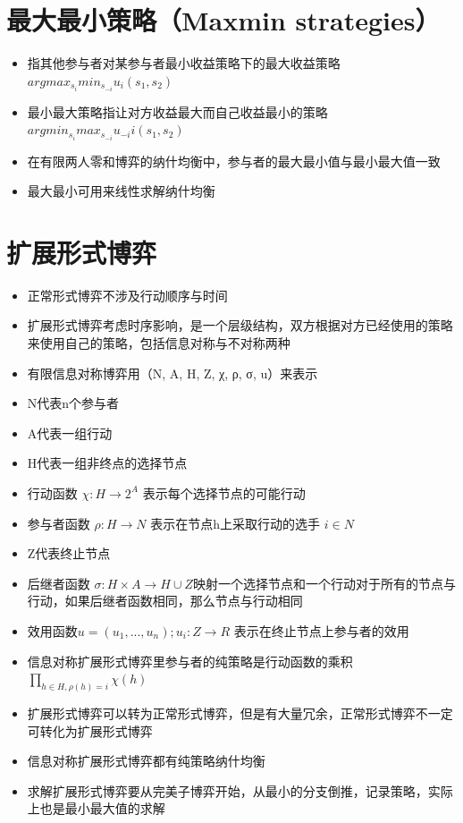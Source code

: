 \documentclass[
]{book}
\providecommand{\tightlist}{%
  \setlength{\itemsep}{0pt}\setlength{\parskip}{0pt}}
\begin{document}
\hypertarget{ux6700ux5927ux6700ux5c0fux7b56ux7565maxmin-strategies}{%
\section{最大最小策略（Maxmin strategies）}\label{ux6700ux5927ux6700ux5c0fux7b56ux7565maxmin-strategies}}

\begin{itemize}
\tightlist
\item
  指其他参与者对某参与者最小收益策略下的最大收益策略\(arg max_{s_i}min_{s_{-i}}u_i(s_1,s_2)\)
\item
  最小最大策略指让对方收益最大而自己收益最小的策略\(arg min_{s_i}max_{s_{-i}}u_{-i}i(s_1,s_2)\)
\item
  在有限两人零和博弈的纳什均衡中，参与者的最大最小值与最小最大值一致
\item
  最大最小可用来线性求解纳什均衡
\end{itemize}

\hypertarget{ux6269ux5c55ux5f62ux5f0fux535aux5f08}{%
\section{扩展形式博弈}\label{ux6269ux5c55ux5f62ux5f0fux535aux5f08}}

\begin{itemize}
\tightlist
\item
  正常形式博弈不涉及行动顺序与时间
\item
  扩展形式博弈考虑时序影响，是一个层级结构，双方根据对方已经使用的策略来使用自己的策略，包括信息对称与不对称两种
\item
  有限信息对称博弈用（N, A, H, Z, χ, ρ, σ, u）来表示
\item
  N代表n个参与者
\item
  A代表一组行动
\item
  H代表一组非终点的选择节点
\item
  行动函数 \(\chi:H \rightarrow 2^A\) 表示每个选择节点的可能行动
\item
  参与者函数 \(\rho:H \rightarrow N\) 表示在节点h上采取行动的选手 \(i\in N\)
\item
  Z代表终止节点
\item
  后继者函数 \(\sigma:H\times A\rightarrow H \cup Z\)映射一个选择节点和一个行动对于所有的节点与行动，如果后继者函数相同，那么节点与行动相同
\item
  效用函数\(u=(u_1,...,u_n);u_i:Z\rightarrow R\) 表示在终止节点上参与者的效用
\item
  信息对称扩展形式博弈里参与者的纯策略是行动函数的乘积\(\prod_{h\in H,\rho(h)=i}\chi(h)\)
\item
  扩展形式博弈可以转为正常形式博弈，但是有大量冗余，正常形式博弈不一定可转化为扩展形式博弈
\item
  信息对称扩展形式博弈都有纯策略纳什均衡
\item
  求解扩展形式博弈要从完美子博弈开始，从最小的分支倒推，记录策略，实际上也是最小最大值的求解
\end{itemize}
\end{document}
